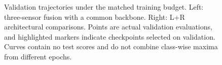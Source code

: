 \begin{figure}[p]
\centering
{}
\caption{Validation trajectories under the matched training budget. Left: three-sensor fusion with a common backbone. Right: L+R architectural comparisons. Points are actual validation evaluations, and highlighted markers indicate checkpoints selected on validation. Curves contain no test scores and do not combine class-wise maxima from different epochs.}
\label{fig:g1}
\end{figure}
